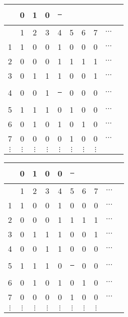 \documentclass[compress,17pt]{beamer}
\newcommand\hl{\bgroup\markoverwith
    {\textcolor{yellow}{\rule[-.5ex]{.1pt}{2.5ex}}}\ULon}
\begin{document}
\begin{frame}
  \begin{tabular}{ | c | c c c c c c c c c }
    \hline
    &  0 & 1 & 0 & \hl 0 \\
    \hline
      & 1 & 2 & 3 & 4 & 5 & 6 & 7 & $\cdots$\\
      \hline
    1 & 1 & 0 & 0 & 1 & 0 & 0 & 0 & $\cdots$\\
    2 & 0 & 0 & 0 & 1 & 1 & 1 & 1 & $\cdots$\\
    3 & 0 & 1 & 1 & 1 & 0 & 0 & 1 & $\cdots$\\
    4 & 0 & 0 & 1 & \hl 1 & 0 & 0 & 0 & $\cdots$\\
    5 & 1 & 1 & 1 & 0 & 1 & 0 & 0 & $\cdots$\\
    6 & 0 & 1 & 0 & 1 & 0 & 1 & 0 & $\cdots$\\
    7 & 0 & 0 & 0 & 0 & 1 & 0 & 0 & $\cdots$\\
    $\vdots$ & $\vdots$ & $\vdots$ & $\vdots$ & $\vdots$ & $\vdots$ & $\vdots$ & $\vdots$ & \\
  \end{tabular}
\end{frame}

\begin{frame}
  \begin{tabular}{ | c | c c c c c c c c c }
    \hline
    &  0 & 1 & 0 & 0 & \hl 0 \\
    \hline
      & 1 & 2 & 3 & 4 & 5 & 6 & 7 & $\cdots$\\
      \hline
    1 & 1 & 0 & 0 & 1 & 0 & 0 & 0 & $\cdots$\\
    2 & 0 & 0 & 0 & 1 & 1 & 1 & 1 & $\cdots$\\
    3 & 0 & 1 & 1 & 1 & 0 & 0 & 1 & $\cdots$\\
    4 & 0 & 0 & 1 & 1 & 0 & 0 & 0 & $\cdots$\\
    5 & 1 & 1 & 1 & 0 & \hl 1 & 0 & 0 & $\cdots$\\
    6 & 0 & 1 & 0 & 1 & 0 & 1 & 0 & $\cdots$\\
    7 & 0 & 0 & 0 & 0 & 1 & 0 & 0 & $\cdots$\\
    $\vdots$ & $\vdots$ & $\vdots$ & $\vdots$ & $\vdots$ & $\vdots$ & $\vdots$ & $\vdots$ & \\
  \end{tabular}
\end{frame}
\end{document}
